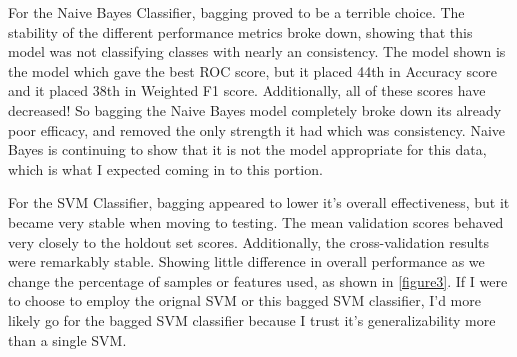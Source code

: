 \documentclass[12pt]{article}
\begin{document}
For the Naive Bayes Classifier, bagging proved to be a terrible choice. The stability of the different performance metrics broke down, showing 
that this model was not classifying classes with nearly an consistency. The model shown is the model which gave the best ROC score, but it placed 
44th in Accuracy score and it placed 38th in Weighted F1 score. Additionally, all of these scores have decreased! So bagging the Naive Bayes model
completely broke down its already poor efficacy, and removed the only strength it had which was consistency. Naive Bayes is continuing to show that 
it is not the model appropriate for this data, which is what I expected coming in to this portion.

For the SVM Classifier, bagging appeared to lower it's overall effectiveness, but it became very stable when moving to testing. The mean validation 
scores behaved very closely to the holdout set scores. Additionally, the cross-validation results were remarkably stable. Showing little difference 
in overall performance as we change the percentage of samples or features used, as shown in \ref{figure3}.
If I were to choose to employ the orignal SVM or this bagged SVM classifier, I'd more likely go for the bagged SVM classifier because I trust it's 
generalizability more than a single SVM. 
\end{document}
